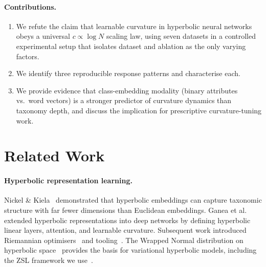 \documentclass{article}
\begin{document}
\paragraph{Contributions.}
\begin{enumerate}
    \item We refute the claim that learnable curvature in hyperbolic neural networks obeys a universal $c \propto \log N$ scaling law, using seven datasets in a controlled experimental setup that isolates dataset and ablation as the only varying factors.
    \item We identify three reproducible response patterns and characterise each.
    \item We provide evidence that class-embedding modality (binary attributes vs.\ word vectors) is a stronger predictor of curvature dynamics than taxonomy depth, and discuss the implication for prescriptive curvature-tuning work.
\end{enumerate}

\section{Related Work}\label{sec:related}

\paragraph{Hyperbolic representation learning.}
Nickel \& Kiela~\cite{nickel2017poincare} demonstrated that hyperbolic embeddings can capture taxonomic structure with far fewer dimensions than Euclidean embeddings.
Ganea et al.~\cite{ganea2018hyperbolic} extended hyperbolic representations into deep networks by defining hyperbolic linear layers, attention, and learnable curvature.
Subsequent work introduced Riemannian optimisers~\cite{becigneul2019riemannian} and tooling~\cite{kochurov2020geoopt}.
The Wrapped Normal distribution on hyperbolic space~\cite{mathieu2019continuous,nagano2019wrapped} provides the basis for variational hyperbolic models, including the ZSL framework we use~\cite{bejleri2025bayesian}.
\end{document}
